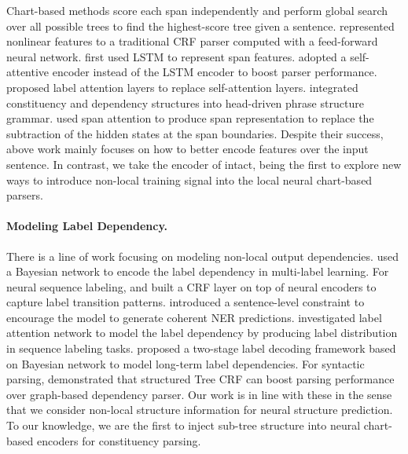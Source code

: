 \documentclass[11pt]{article}
\begin{document}
Chart-based methods score each span independently and perform global search over all possible trees to find the highest-score tree given a sentence. 
\citet{crf-parsing} represented nonlinear features to a traditional CRF parser computed with a feed-forward neural network. 
\citet{stern-etal-2017-minimal} first used LSTM to represent span features. 
\citet{san-constituency} adopted a self-attentive encoder instead of the LSTM encoder to boost parser performance.
\citet{label-attention-parsing} proposed label attention layers to replace self-attention layers.
\citet{head-driven} integrated constituency and dependency structures into head-driven phrase structure grammar.
\citet{span-attention} used span attention to produce span representation to replace the subtraction of the hidden states at the span boundaries.
Despite their success, above work mainly focuses on how to better encode features over the input sentence. In contrast, we take the encoder of \citet{san-constituency} intact, being the first to explore new ways to introduce non-local training signal into the local neural chart-based parsers.


\paragraph{Modeling Label Dependency.}
There is a line of work focusing on modeling non-local output dependencies. 
\citet{mll} used a Bayesian network to encode the label dependency in multi-label learning.
For neural sequence labeling, \citet{zhou-xu-2015-end} and \citet{lstm-crf} built a CRF layer on top of neural encoders to capture label transition patterns.
\citet{forest-ner} introduced a sentence-level constraint to encourage the model to generate coherent NER predictions. \citet{lan} investigated label attention network to model the label dependency by producing label distribution in sequence labeling tasks. \citet{gui-etal-2020-uncertainty} proposed a two-stage label decoding framework based on Bayesian network to model long-term label dependencies. For syntactic parsing, \citet{constituency-crf} demonstrated that structured Tree CRF can boost parsing performance over graph-based dependency parser. 
Our work is in line with these in the sense that we consider non-local structure information for neural structure prediction.
To our knowledge, we are the first to inject sub-tree structure into neural chart-based encoders for constituency parsing.
\end{document}
